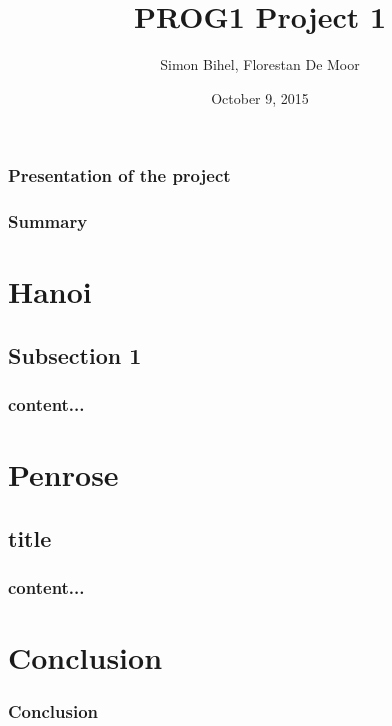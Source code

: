 \documentclass{beamer}
\title[Defense]{PROG1 Project 1}
\author{Simon Bihel, Florestan De Moor}
\institute[ENS Rennes]{\texttt{[image: ENS\_Rennes.png]}\\Computer Science Department, 1st year}
\date{October 9, 2015}
\begin{document}
	\begin{frame}
		\maketitle
	\end{frame}
	
	\begin{frame}
		\frametitle{Presentation of the project}
	\end{frame}
	
	\begin{frame}
		\frametitle{Summary}
		\tableofcontents
	\end{frame}
	
	\section{Hanoi}
	\subsection*{Subsection 1}
	\begin{frame}
		\frametitle{content...}
	\end{frame}
	
	\section{Penrose}
	\subsection*{title}
	\begin{frame}
		\frametitle{content...}
	\end{frame}
	
	\section*{Conclusion}
	\begin{frame}
		\frametitle{Conclusion}
	\end{frame}
\end{document}
